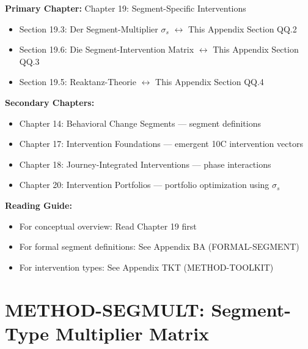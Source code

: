 \begin{tcolorbox}[colback=purple!5!white, colframe=purple!75!black,
    title=Chapter Linkage]

\textbf{Primary Chapter:} Chapter 19: Segment-Specific Interventions
\begin{itemize}[nosep]
\item Section 19.3: Der Segment-Multiplier $\sigma_s$ $\leftrightarrow$ This Appendix Section QQ.2
\item Section 19.6: Die Segment-Intervention Matrix $\leftrightarrow$ This Appendix Section QQ.3
\item Section 19.5: Reaktanz-Theorie $\leftrightarrow$ This Appendix Section QQ.4
\end{itemize}

\textbf{Secondary Chapters:}
\begin{itemize}[nosep]
\item Chapter 14: Behavioral Change Segments --- segment definitions
\item Chapter 17: Intervention Foundations --- emergent 10C intervention vectors
\item Chapter 18: Journey-Integrated Interventions --- phase interactions
\item Chapter 20: Intervention Portfolios --- portfolio optimization using $\sigma_s$
\end{itemize}

\textbf{Reading Guide:}
\begin{itemize}[nosep]
\item For conceptual overview: Read Chapter 19 first
\item For formal segment definitions: See Appendix BA (FORMAL-SEGMENT)
\item For intervention types: See Appendix TKT (METHOD-TOOLKIT)
\end{itemize}

\end{tcolorbox}


\chapter{METHOD-SEGMULT: Segment-Type Multiplier Matrix}
\label{app:segmult}



